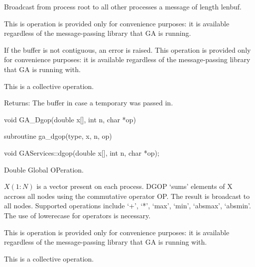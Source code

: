 \documentclass[12pt]{article}
\begin{document}
\wcoll
\begin{desc}

Broadcast from process root to all other processes a message of length lenbuf.

This is operation is provided only for convenience purposes: it is available
regardless of the message-passing library that GA is running.

If the buffer is not contiguous, an error is raised. This operation is provided
only for convenience purposes: it is available regardless of the message-passing
library that GA is running with.


This is a collective operation.

Returns:
The buffer in case a temporary was passed in.
\end{desc}


\begin{capi}
\begin{ccode}
void GA_Dgop(double x[], int n, char *op)
\end{ccode}
\begin{funcargs}
\end{funcargs}
\end{capi}

\begin{fapi}
\begin{fcode}
subroutine ga_dgop(type, x, n, op)
\end{fcode}
\begin{funcargs}
\end{funcargs}
\end{fapi}

\begin{cxxapi}
\begin{cxxcode}
void GAServices::dgop(double x[], int n, char *op);
\end{cxxcode}
\begin{funcargs}
\end{funcargs}
\end{cxxapi}


\wcoll
\begin{desc}

Double Global OPeration.

$X(1:N)$ is a vector present on each process. DGOP `sums' elements of
X accross all nodes using the commutative operator OP. The result is
broadcast to all nodes. Supported operations include `+', `*', `max',
`min', `absmax', `absmin'. The use of lowerecase for operators is necessary.

This is operation is provided only for convenience purposes: it is available
regardless of the message-passing library that GA is running with.

This is a collective operation.
\end{desc}
\end{document}
